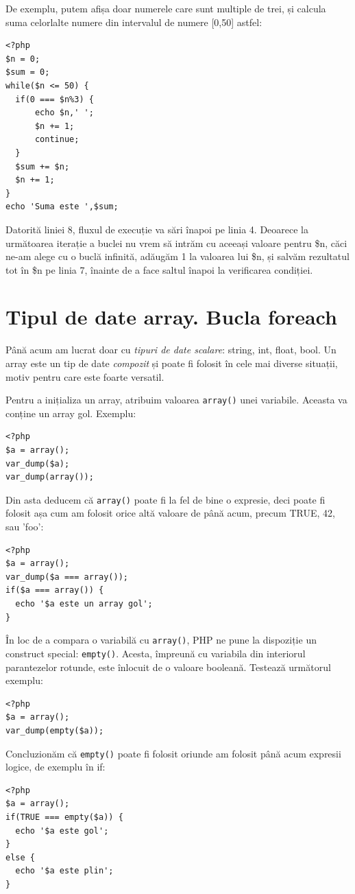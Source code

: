 De exemplu, putem afișa doar numerele care sunt multiple
de trei, și calcula suma celorlalte numere din intervalul
de numere [0,50] astfel:
\begin{lstlisting}
<?php
$n = 0;
$sum = 0;
while($n <= 50) {
  if(0 === $n%3) {
	  echo $n,' ';
	  $n += 1;
	  continue;
  }
  $sum += $n;
  $n += 1;
}
echo 'Suma este ',$sum;
\end{lstlisting}
Datorită liniei 8, fluxul de execuție va sări înapoi pe linia 4.
Deoarece la următoarea iterație a buclei nu vrem să intrăm cu aceeași valoare pentru \$n,
căci ne-am alege cu o buclă infinită, adăugăm 1 la valoarea lui \$n, și
salvăm rezultatul tot în \$n pe linia 7, înainte de a face saltul înapoi la verificarea
condiției.
 

\section{Tipul de date array. Bucla foreach}
Până acum am lucrat doar cu \textsl{tipuri de date scalare}: string, int, float, bool.
Un array este un tip de date \textsl{compozit} și poate fi folosit în cele mai
diverse situații, motiv pentru care este foarte versatil.

Pentru a inițializa un array, atribuim valoarea \texttt{array()} unei variabile.
Aceasta va conține un array gol. Exemplu:
\begin{lstlisting}
<?php
$a = array();
var_dump($a);
var_dump(array());
\end{lstlisting}
Din asta deducem că \texttt{array()} poate fi la fel de bine o expresie,
deci poate fi folosit așa cum am folosit orice altă valoare de până acum,
precum TRUE, 42, sau 'foo':
\begin{lstlisting}
<?php
$a = array();
var_dump($a === array());
if($a === array()) {
  echo '$a este un array gol';
}
\end{lstlisting}

În loc de a compara o variabilă cu \texttt{array()}, PHP
ne pune la dispoziție un construct special: \texttt{empty()}.
Acesta, împreună cu variabila din interiorul parantezelor
rotunde, este înlocuit de o valoare booleană. Testează
următorul exemplu:
\begin{lstlisting}
<?php
$a = array();
var_dump(empty($a));
\end{lstlisting}
Concluzionăm că \texttt{empty()} poate fi folosit oriunde
am folosit până acum expresii logice, de exemplu în if:

\begin{lstlisting}
<?php
$a = array();
if(TRUE === empty($a)) {
  echo '$a este gol';
}
else {
  echo '$a este plin';
}
\end{lstlisting}

